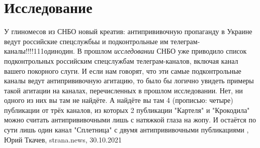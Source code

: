  
 
 
 
 
\chapter{Исследование}

У глиномесов из СНБО новый креатив: антипрививочную пропаганду в Украине ведут
российские спецслужбьы и подконтрольные им телеграм-каналы!!!!111одинодин.  В
прошлом \emph{исследовании} СНБО уже приводило список подконтрольных российским
спецслужбам телеграм-каналов, включая канал вашего покорного слуги. И если нам
говорят, что эти самые подконтрольные каналы ведут антипрививочную агитацию, то
было бы логично увидеть примеры такой агитации на каналах, перечисленных в
прошлом исследовании. Нет, ни одного из них вы там не найдёте.  А найдёте вы
там 4 (прописью: четыре) публикации от трёх каналов, из которых 2 публикации
"Картеля" и "Крокодила" можно считать антипрививочными лишь с натяжкой глаза на
жопу. И остаётся по сути лишь один канал "Сплетница" с двумя антипрививочными
публикациями
, 
Юрий Ткачев, strana.news, 30.10.2021
